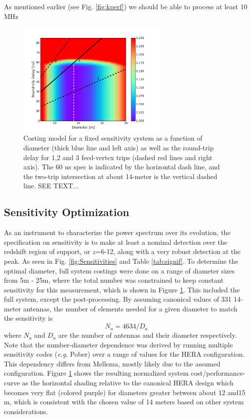 \documentclass[preprint,11pt]{aastex}
\begin{document}
As mentioned earlier (see Fig. \ref{fig:kperf}) we should be able to process at least 10 MHz 

\begin{figure}[t]
\centerline{
\includegraphics[width=7.5cm]{plots/costfigNew.png} 
}
\caption{\small Costing model for a fixed sensitivity system as a function of diameter (thick blue line and left axis) as well as the round-trip delay for 1,2 and 3 feed-vertex trips (dashed red lines and right axis).  The 60 ns spec is indicated by the horizontal dash line, and the two-trip intersection at about 14-meter is the vertical dashed line.  SEE TEXT...
\label{fig:costfig}}
\end{figure}



\subsection{Sensitivity Optimization}
\label{sec:cost}
As an instrument to characterize the power spectrum over its evolution, the specification on sensitivity is to make at least a nominal detection over the redshift region of support, or $z$=6-12, along with a very robust detection at the peak.  As seen in Fig. \ref{fig:Sensitivities} and Table \ref{tab:signif}.
To determine the optimal diameter, full system costings were done on a range of diameter sizes from 5m - 25m, where the total number was constrained to keep constant sensitivity for this measurement, which is shown in Figure \ref{fig:costfig}.  This included the full system, except the post-processing.  By assuming canonical values of 331 14-meter antennas, the number of elements needed for a given diameter to match the sensitivity is
\begin{equation}
N_a = 4634/D_a
\end{equation}
where $N_a$ and $D_a$ are the number of antennas and their diameter respectively.  Note that the number-diameter dependence was derived by running multiple sensitivity codes ({\em e.g.} Pober) over a range of values for the HERA configuration.  This dependency differs from Mellema, mostly likely due to the assumed configuration.
Figure \ref{fig:costfig} shows the resulting normalized system cost/performance-curve as the horizontal shading relative to the canonical HERA design 
which becomes very flat (colored purple) for diameters greater between about 12 and15 m, which is consistent with the chosen value of 14 meters based on other system considerations.
\end{document}
